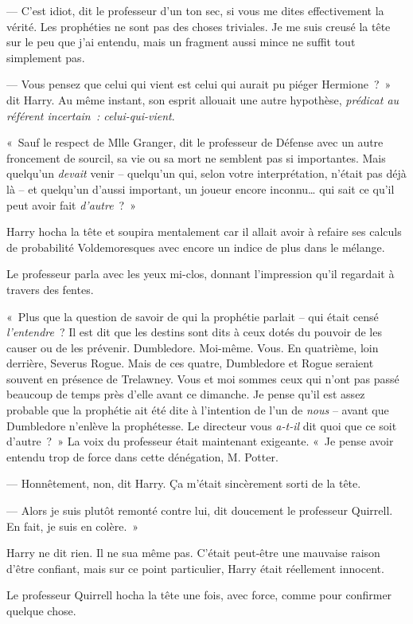 --- C'est idiot, dit le professeur d'un ton sec, si vous me dites effectivement la vérité. Les prophéties ne sont pas des choses triviales. Je me suis creusé la tête sur le peu que j'ai entendu, mais un fragment aussi mince ne suffit tout simplement pas.

--- Vous pensez que celui qui vient est celui qui aurait pu piéger Hermione~?~» dit Harry. Au même instant, son esprit allouait une autre hypothèse, \emph{prédicat au référent incertain~: celui-qui-vient}.

«~Sauf le respect de Mlle Granger, dit le professeur de Défense avec un autre froncement de sourcil, sa vie ou sa mort ne semblent pas si importantes. Mais quelqu'un \emph{devait} venir -- quelqu'un qui, selon votre interprétation, n'était pas déjà là -- et quelqu'un d'aussi important, un joueur encore inconnu… qui sait ce qu'il peut avoir fait \emph{d'autre}~?~»

Harry hocha la tête et soupira mentalement car il allait avoir à refaire ses calculs de probabilité Voldemoresques avec encore un indice de plus dans le mélange.

Le professeur parla avec les yeux mi-clos, donnant l'impression qu'il regardait à travers des fentes.

«~Plus que la question de savoir de qui la prophétie parlait -- qui était censé \emph{l'entendre}~? Il est dit que les destins sont dits à ceux dotés du pouvoir de les causer ou de les prévenir. Dumbledore. Moi-même. Vous. En quatrième, loin derrière, Severus Rogue. Mais de ces quatre, Dumbledore et Rogue seraient souvent en présence de Trelawney. Vous et moi sommes ceux qui n'ont pas passé beaucoup de temps près d'elle avant ce dimanche. Je pense qu'il est assez probable que la prophétie ait été dite à l'intention de l'un de \emph{nous} -- avant que Dumbledore n'enlève la prophétesse. Le directeur vous \emph{a-t-il} dit quoi que ce soit d'autre~?~» La voix du professeur était maintenant exigeante. «~Je pense avoir entendu trop de force dans cette dénégation, M. Potter.

--- Honnêtement, non, dit Harry. Ça m'était sincèrement sorti de la tête.

--- Alors je suis plutôt remonté contre lui, dit doucement le professeur Quirrell. En fait, je suis en colère.~»

Harry ne dit rien. Il ne sua même pas. C'était peut-être une mauvaise raison d'être confiant, mais sur ce point particulier, Harry était réellement innocent.

Le professeur Quirrell hocha la tête une fois, avec force, comme pour confirmer quelque chose.

